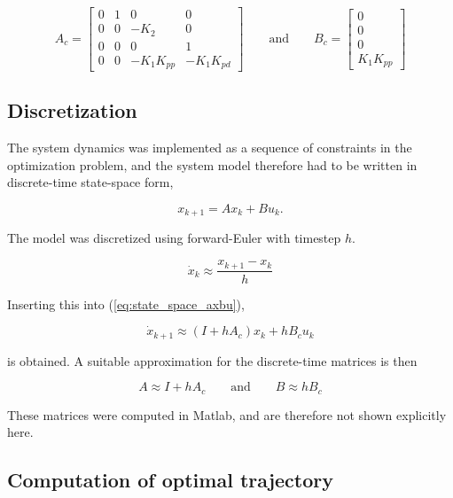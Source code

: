 \begin{equation}
	A_c = \begin{bmatrix} 0 & 1 & 0 & 0 \\ 0 & 0 & -K_2 & 0 \\ 0 & 0 & 0 & 1 \\ 0 & 0 & -K_1K_{pp} & -K_1K_{pd} \end{bmatrix}
	\qquad\text{and}\qquad
	B_c = \begin{bmatrix}0 \\ 0 \\ 0 \\K_1K_{pp} \end{bmatrix}
\end{equation}


\subsection{Discretization}

The system dynamics was implemented as a sequence of constraints in the optimization problem, and the system model therefore had to be written in discrete-time state-space form,

\begin{equation}
	x_{k+1} = Ax_k + Bu_k.
	\label{eq:discrete_state_space_axbu}
\end{equation}

The model was discretized using forward-Euler with timestep $h$.

\begin{equation}
	\dot{x}_k \approx \frac{x_{k+1} - x_k}{h}
\end{equation}

Inserting this into (\ref{eq:state_space_axbu}),

\begin{equation}
	\dot{x}_{k+1} \approx (I + hA_c) x_k + hB_c u_k
\end{equation}

is obtained. A suitable approximation for the discrete-time matrices is then

\begin{equation}
	A \approx I + hA_c
	\qquad\text{and}\qquad
	B \approx hB_c
\end{equation}

These matrices were computed in Matlab, and are therefore not shown explicitly here.


\subsection{Computation of optimal trajectory}


